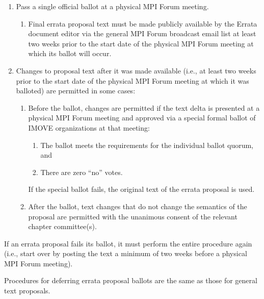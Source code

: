 \begin{enumerate}

\item Pass a single official ballot at a physical MPI Forum meeting.
  \begin{enumerate}
  \item Final errata proposal text must be made publicly available by
    the Errata document editor via the general MPI Forum broadcast
    email list at least two weeks prior to the start date of the
    physical MPI Forum meeting at which its ballot will occur.
  \end{enumerate}

\item Changes to proposal text after it was made available (i.e., at
  least two weeks prior to the start date of the physical MPI Forum
  meeting at which it was balloted) are permitted in some cases:
  \begin{enumerate}
  \item Before the ballot, changes are permitted if the text delta is
    presented at a physical MPI Forum meeting and approved via a
    special formal ballot of IMOVE organizations at that meeting:
    \begin{enumerate}
    \item The ballot meets the requirements for the individual
      ballot quorum, and
    \item There are zero ``no'' votes.
    \end{enumerate}

    If the special ballot fails, the original text of the errata
    proposal is used.
  \item After the ballot, text changes that do not change the
    semantics of the proposal are permitted with the unanimous consent
    of the relevant chapter committee(s).
  \end{enumerate}
\end{enumerate}

If an errata proposal fails its ballot, it must perform the entire
procedure again (i.e., start over by posting the text a minimum of two
weeks before a physical MPI Forum meeting).

Procedures for deferring errata proposal ballots are the same as
those for general text proposals.



